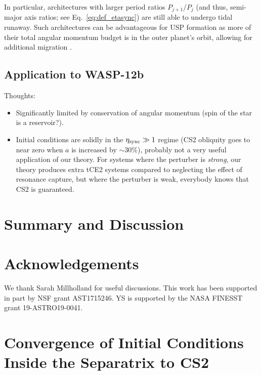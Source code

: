 \documentclass[
        fleqn,
        usenatbib,
    ]{mnras}
\begin{document}
In particular, architectures with larger period ratios $P_{j + 1} / P_j$ (and
thus, semi-major axis ratios; see Eq.~\ref{eq:def_etasync}) are still able to
undergo tidal runaway. Such architectures can be advantageous for USP formation
as more of their total angular momentum budget is in the outer planet's orbit,
allowing for additional migration \citep{fabrycky_otides,
millholland2020formation}.

\subsection{Application to WASP-12b}\label{ss:disc_wasp12b}

Thoughts:
\begin{itemize}
    \item Significantly limited by conservation of angular momentum (spin of the
        star is a reservoir?).

    \item Initial conditions are solidly in the $\eta_{\rm sync} \gg 1$ regime
        (CS2 obliquity goes to near zero when $a$ is increased by $\sim30\%$),
        probably not a very useful application of our theory. For systems where
        the perturber is \emph{strong}, our theory produces extra tCE2 systems
        compared to neglecting the effect of resonance capture, but where the
        perturber is weak, everybody knows that CS2 is guaranteed.
\end{itemize}

\section{Summary and Discussion}\label{s:summary}

\section{Acknowledgements}

We thank Sarah Millholland for useful discussions. This work has been supported
in part by NSF grant AST1715246. YS is supported by the NASA FINESST grant
19-ASTRO19-0041.%




\appendix

\onecolumn

\section{Convergence of Initial Conditions Inside the Separatrix to CS2
}\label{app:cs_stab2}
\end{document}
